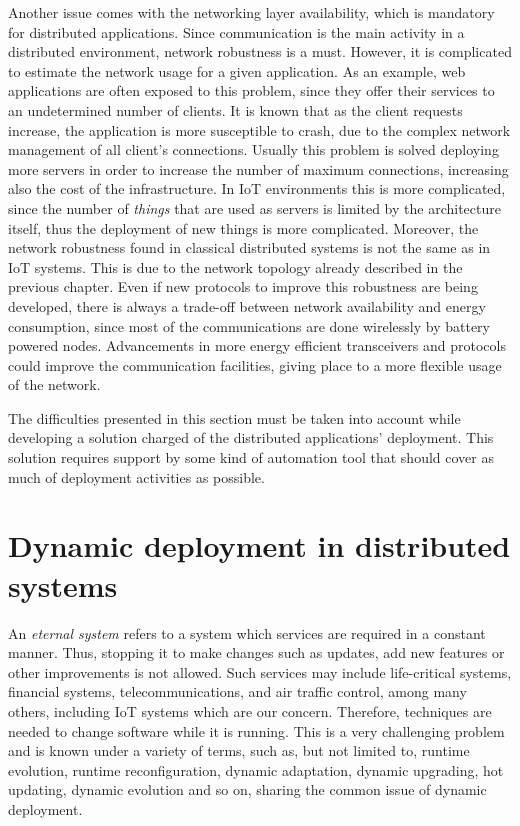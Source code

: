 Another issue comes with the networking layer availability, which is mandatory for distributed applications.
Since communication is the main activity in a distributed environment, network robustness is a must.
However, it is complicated to estimate the network usage for a given application.
As an example, web applications are often exposed to this problem, since they offer their services to an undetermined number of clients.
It is known that as the client requests increase, the application is more susceptible to crash, due to the complex network management of all client's connections.
Usually this problem is solved deploying more servers in order to increase the number of maximum connections, increasing also the cost of the infrastructure.
In IoT environments this is more complicated, since the number of \textit{things} that are used as servers is limited by the architecture itself, thus the deployment of new things is more complicated.
Moreover, the network robustness found in classical distributed systems is not the same as in IoT systems.
This is due to the network topology already described in the previous chapter.
Even if new protocols to improve this robustness are being developed\cite{thubert2013ietf}, there is always a trade-off between network availability and energy consumption, since most of the communications are done wirelessly by battery powered nodes.
Advancements in more energy efficient transceivers and protocols could improve the communication facilities, giving place to a more flexible usage of the network.

The difficulties presented in this section must be taken into account while developing a solution charged of the distributed applications' deployment.
This solution requires support by some kind of automation tool that should cover as much of deployment activities as possible. 

\section{Dynamic deployment in distributed systems}
\label{sec:dynamicDeploymentDAS}
An \textit{eternal system} refers to a system which services are required in a constant manner.
Thus, stopping it to make changes such as updates, add new features or other improvements is not allowed.
Such services may include life-critical systems, financial systems, telecommunications, and air traffic control, among many others, including IoT systems which are our concern.
Therefore, techniques are needed to change software while it is running. 
This is a very challenging problem and is known under a variety of terms, such as, but not limited to, runtime evolution, runtime reconfiguration, dynamic adaptation, dynamic upgrading, hot updating, dynamic evolution and so on, sharing the common issue of dynamic deployment.

